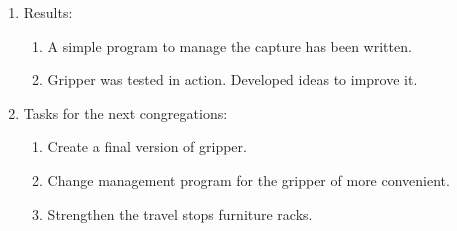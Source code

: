 \begin{enumerate}
\begin{enumerate}
    \end{enumerate}
    
	\item Results: 
	\begin{enumerate}
	  \item A simple program to manage the capture has been written.
	  
      \item Gripper was tested in action. Developed ideas to improve it.
      
    \end{enumerate}
    
	\item Tasks for the next congregations:
	\begin{enumerate}
	  \item Create a final version of gripper.
	  
	  \item Change management program for the gripper of more convenient.
	  
	  \item Strengthen the travel stops furniture racks.

    \end{enumerate}     
\end{enumerate}
\fillpage
